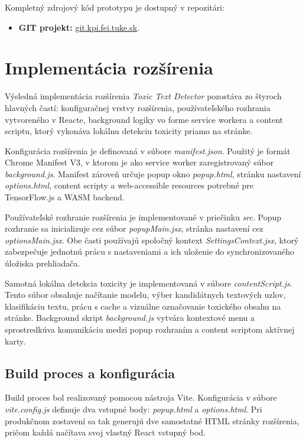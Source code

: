 Kompletný zdrojový kód prototypu je dostupný v repozitári:
\begin{itemize}
  \item \textbf{GIT projekt:} \href{https://git.kpi.fei.tuke.sk/vs800ru/ux3-vladyslav-stakhov}{git.kpi.fei.tuke.sk}.
\end{itemize}

\section{Implementácia rozšírenia}
Výsledná implementácia rozšírenia \textit{Toxic Text Detector} pozostáva zo štyroch hlavných častí: konfiguračnej vrstvy rozšírenia, používateľského rozhrania vytvoreného v Reacte, background logiky vo forme service workera a content scriptu, ktorý vykonáva lokálnu detekciu toxicity priamo na stránke.

Konfigurácia rozšírenia je definovaná v súbore \emph{manifest.json}. Použitý je formát Chrome Manifest V3, v ktorom je ako service worker zaregistrovaný súbor \emph{background.js}. Manifest zároveň určuje popup okno \emph{popup.html}, stránku nastavení \emph{options.html}, content scripty a web-accessible resources potrebné pre TensorFlow.js a WASM backend.

Používateľské rozhranie rozšírenia je implementované v priečinku \emph{src}. Popup rozhranie sa inicializuje cez súbor \emph{popupMain.jsx}, stránka nastavení cez \emph{optionsMain.jsx}. Obe časti používajú spoločný kontext \emph{SettingsContext.jsx}, ktorý zabezpečuje jednotnú prácu s nastaveniami a ich uloženie do synchronizovaného úložiska prehliadača.

Samotná lokálna detekcia toxicity je implementovaná v súbore \emph{contentScript.js}. Tento súbor obsahuje načítanie modelu, výber kandidátnych textových uzlov, klasifikáciu textu, prácu s cache a vizuálne označovanie toxického obsahu na stránke. Background skript \emph{background.js} vytvára kontextové menu a sprostredkúva komunikáciu medzi popup rozhraním a content scriptom aktívnej karty.

\subsection{Build proces a konfigurácia}
Build proces bol realizovaný pomocou nástroja Vite. Konfigurácia v súbore \emph{vite.config.js} definuje dva vstupné body: \emph{popup.html} a \emph{options.html}. Pri produkčnom zostavení sa tak generujú dve samostatné HTML stránky rozšírenia, pričom každá načítava svoj vlastný React vstupný bod.


